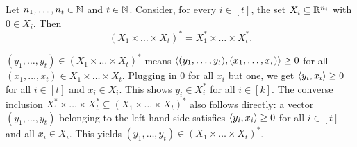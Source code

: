 \begin{exercise}
	\label{dual:of:product}
	Let $n_1,\ldots,n_t \in \mathbb{N}$ and $t \in \mathbb{N}$. Consider, for every $i \in [t]$, the set $X_i \subseteq \mathbb{R}^{n_i}$ with $0 \in X_i$. Then 
	\[
		(X_1 \times \ldots \times X_t)^\ast = X_1^\ast \times \ldots \times X_t^\ast. 
	\]
\end{exercise}
\begin{solution} 
	$(y_1,\ldots,y_t) \in (X_1 \times \ldots \times X_t)^\ast$ means $\left\langle (y_1,\ldots,y_t) , (x_1,\ldots,x_t) \right\rangle \ge 0$ for all $(x_1,\ldots,x_t) \in X_1 \times \ldots \times X_t$. Plugging in $0$ for all  $x_i$ but one, we get $\left\langle y_i , x_i \right\rangle \ge 0$ for all $i \in [t]$ and $x_i \in X_i$. This shows $y_i \in X_i^\ast$ for all $i \in [k]$. The converse inclusion $X_1^\ast \times \ldots \times X_t^\ast \subseteq (X_1 \times \ldots \times X_t)^\ast$ also follows directly: a vector $(y_1,\ldots,y_t)$ belonging to the left hand side satisfies  $\left\langle y_i , x_i \right\rangle \ge 0$ for all $i \in [t]$ and all $x_i \in X_i$. This yields $(y_1,\ldots,y_t) \in (X_1 \times \ldots \times X_t)^\ast$.
\end{solution}

